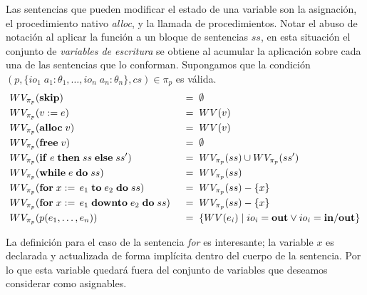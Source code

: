 Las sentencias que pueden modificar el estado de una variable son la asignación, el procedimiento nativo \textit{alloc}, y la llamada de procedimientos.
Notar el abuso de notación al aplicar la función a un bloque de sentencias $ss$, en esta situación el conjunto de \textit{variables de escritura} se obtiene al acumular la aplicación sobre cada una de las sentencias que lo conforman.
Supongamos que la condición $(p, \{ io_1 \; a_1: \theta_1, \ldots, io_n \; a_n: \theta_n \}, cs) \in \pi_{p}$ es válida.
\begin{alignat*}{2}
&WV_{\pi_{p}}(\mathbf{skip})
&&\;=\;
\emptyset
\\
&WV_{\pi_{p}}(v := e)
&&\;=\;
WV(v)
\\
&WV_{\pi_{p}}(\mathbf{alloc} \; v)
&&\;=\;
WV(v)
\\
&WV_{\pi_{p}}(\mathbf{free} \; v)
&&\;=\;
\emptyset
\\
&WV_{\pi_{p}}(\mathbf{if} \; e \; \mathbf{then} \; ss \; \mathbf{else} \; ss')
&&\;=\;
WV_{\pi_{p}}(ss) \cup WV_{\pi_{p}}(ss')
\\
&WV_{\pi_{p}}(\mathbf{while} \; e \; \mathbf{do} \; ss)
&&\;=\;
WV_{\pi_{p}}(ss)
\\
&WV_{\pi_{p}}(\mathbf{for} \; x := \, e_1 \; \mathbf{to} \; e_2 \; \mathbf{do} \; ss)
&&\;=\;
WV_{\pi_{p}}(ss) - \{ x \}
\\
&WV_{\pi_{p}}(\mathbf{for} \; x := \, e_1 \; \mathbf{downto} \; e_2 \; \mathbf{do} \; ss)
&&\;=\;
WV_{\pi_{p}}(ss) - \{ x \}
\\
&WV_{\pi_{p}}(p(e_1, \ldots, e_n))
&&\;=\;
\{ WV(e_i) \mid io_i = \mathbf{out} \vee io_i = \mathbf{in/out} \}
\end{alignat*}

La definición para el caso de la sentencia \textit{for} es interesante; la variable $x$ es declarada y actualizada de forma implícita dentro del cuerpo de la sentencia.
Por lo que esta variable quedará fuera del conjunto de variables que deseamos considerar como asignables.

